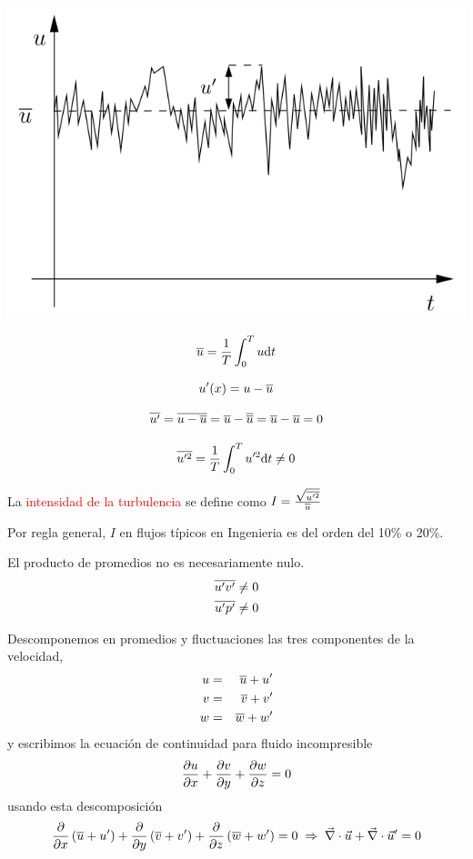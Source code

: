 			
			\begin{center}
				\includegraphics[width=0.7\linewidth]{TeX_files/chapter07-Turbulencia/noise}
			\end{center}
			

				\[
				\overline{u}=\frac{1}{T}\int_{0}^{T}u \text{d} t
				\]
				
				\[
				u'(x)=u-\overline{u}
				\]
				
				\[
	\overline{u'}=\overline{u-\overline{u}} =\overline{u}-\overline{\overline{u}}=\overline{u}-\overline{u}=0
				\]
			
			
			
				\[
				\overline{u'^{2}}=\frac{1}{T}\int_{0}^{T}u'^{2}\text{d} t\neq0
				\]
			

	
	La \textcolor{red}{intensidad de la turbulencia} se define como $I=\frac{\sqrt{\overline{u'^{2}}}}{\overline{u}}$
	
	Por regla general, $I$ en flujos típicos en Ingenieria es del orden
	del 10\% o 20\%.
	
	El producto de promedios no es necesariamente nulo. 
	\begin{align*}
		\overline{u'v'} & \neq0\\
		\overline{u'p'} & \neq0
	\end{align*}
	
	
	Descomponemos en promedios y fluctuaciones las tres componentes de
	la velocidad, 
	\begin{eqnarray*}
		u & = & \overline{u}+u'\\
		v & = & \overline{v}+v'\\
		w & = & \overline{w}+w'
	\end{eqnarray*}
	y escribimos la ecuación de continuidad para fluido incompresible
	\[
	\frac{\partial u}{\partial x}+\frac{\partial v}{\partial y}+\frac{\partial w}{\partial z}=0
	\]
	usando esta descomposición 
	\[
	\frac{\partial }{\partial x}\left(\overline{u}+u'\right)+\frac{\partial }{\partial y}\left(\overline{v}+v'\right)+\frac{\partial }{\partial z}\left(\overline{w}+w'\right)=0\;\Rightarrow\;\vec{\nabla}\cdot\vec{u}+\vec{\nabla}\cdot\vec{u}'=0
	\]
	
